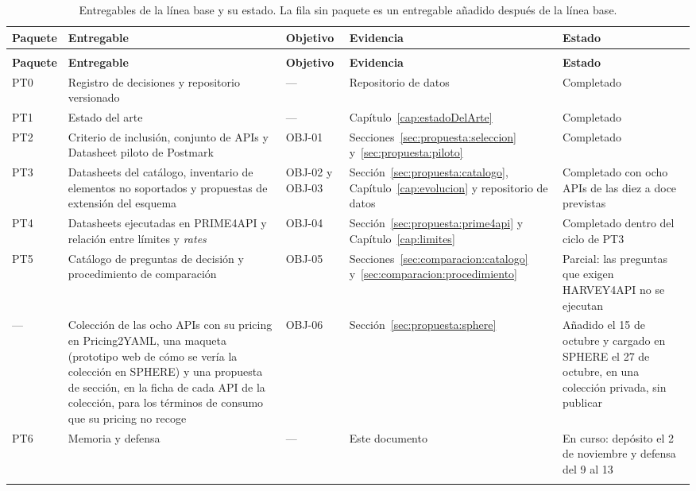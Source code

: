 \begingroup
\setlength{\tabcolsep}{3pt}
\setlength{\LTcapwidth}{\textwidth}
\begin{longtable}{|>{\footnotesize}p{}|>{\footnotesize}p{}|>{\footnotesize}p{}|>{\footnotesize}p{}|>{\footnotesize}p{}|}
\hline
\raggedright \textbf{Paquete} & \raggedright \textbf{Entregable} & \raggedright \textbf{Objetivo} & \raggedright \textbf{Evidencia} & \raggedright \textbf{Estado} \tabularnewline
\hline
\endfirsthead
\multicolumn{5}{l}{\footnotesize\textit{(continuación)}} \tabularnewline
\hline
\raggedright \textbf{Paquete} & \raggedright \textbf{Entregable} & \raggedright \textbf{Objetivo} & \raggedright \textbf{Evidencia} & \raggedright \textbf{Estado} \tabularnewline
\hline
\endhead
\raggedright PT0 & \raggedright Registro de decisiones y repositorio versionado & \raggedright --- & \raggedright Repositorio de datos & \raggedright Completado \tabularnewline
\hline
\raggedright PT1 & \raggedright Estado del arte & \raggedright --- & \raggedright Capítulo~\ref{cap:estadoDelArte} & \raggedright Completado \tabularnewline
\hline
\raggedright PT2 & \raggedright Criterio de inclusión, conjunto de APIs y Datasheet piloto de Postmark & \raggedright OBJ-01 & \raggedright Secciones~\ref{sec:propuesta:seleccion} y~\ref{sec:propuesta:piloto} & \raggedright Completado \tabularnewline
\hline
\raggedright PT3 & \raggedright Datasheets del catálogo, inventario de elementos no soportados y propuestas de extensión del esquema & \raggedright OBJ-02 y OBJ-03 & \raggedright Sección~\ref{sec:propuesta:catalogo}, Capítulo~\ref{cap:evolucion} y repositorio de datos & \raggedright Completado con ocho APIs de las diez a doce previstas \tabularnewline
\hline
\raggedright PT4 & \raggedright Datasheets ejecutadas en PRIME4API y relación entre límites y \textit{rates} & \raggedright OBJ-04 & \raggedright Sección~\ref{sec:propuesta:prime4api} y Capítulo~\ref{cap:limites} & \raggedright Completado dentro del ciclo de PT3 \tabularnewline
\hline
\raggedright PT5 & \raggedright Catálogo de preguntas de decisión y procedimiento de comparación & \raggedright OBJ-05 & \raggedright Secciones~\ref{sec:comparacion:catalogo} y~\ref{sec:comparacion:procedimiento} & \raggedright Parcial: las preguntas que exigen HARVEY4API no se ejecutan \tabularnewline
\hline
\raggedright --- & \raggedright Colección de las ocho APIs con su pricing en Pricing2YAML, una maqueta (prototipo web de cómo se vería la colección en SPHERE) y una propuesta de sección, en la ficha de cada API de la colección, para los términos de consumo que su pricing no recoge & \raggedright OBJ-06 & \raggedright Sección~\ref{sec:propuesta:sphere} & \raggedright Añadido el 15 de octubre y cargado en SPHERE el 27 de octubre, en una colección privada, sin publicar \tabularnewline
\hline
\raggedright PT6 & \raggedright Memoria y defensa & \raggedright --- & \raggedright Este documento & \raggedright En curso: depósito el 2 de noviembre y defensa del 9 al 13 \tabularnewline
\hline
\noalign{\vskip\abovecaptionskip}
\caption[Entregables de la línea base y su estado]{Entregables de la línea base y su estado. La fila sin paquete es un entregable añadido después de la línea base.}
\label{tab:metodologia:entregables}
\end{longtable}
\endgroup


